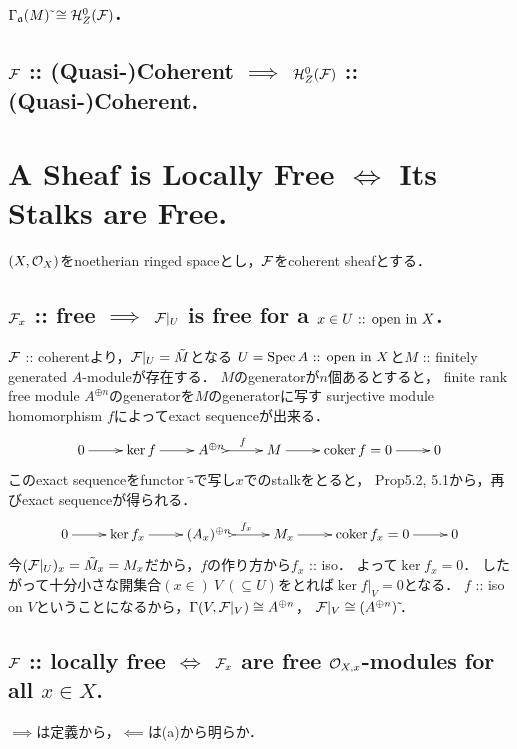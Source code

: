 \documentclass[a4paper]{jsarticle}
\begin{document}
    \subsection{$\Gamma_{\mathfrak{a}}(M)\,\tilde{} \cong \mathcal{H}_Z^0(\mathcal{F})$.}

    \subsection{$\mathcal{F}$ :: (Quasi-)Coherent $\implies$ $\mathcal{H}_Z^0(\mathcal{F})$ :: (Quasi-)Coherent.}

\section{A Sheaf is Locally Free $\iff$ Its Stalks are Free.} %
    $(X,\mathcal{O}_X)$をnoetherian ringed spaceとし，$\mathcal{F}$をcoherent sheafとする．

    \subsection{$\mathcal{F}_x$ :: free $\implies$ $\mathcal{F}|_U$ is free for a $x \in U \text{ :: open in } X$.}
    $\mathcal{F}$ :: coherentより，$\mathcal{F}|_U=\tilde{M}$となる
    $U=\operatorname{Spec} A \text{ :: open in } X$と$M$ :: finitely generated $A$-moduleが存在する．
    $M$のgeneratorが$n$個あるとすると，
    finite rank free module $A^{\oplus n}$のgeneratorを$M$のgeneratorに写す
    surjective module homomorphism $f$によってexact sequenceが出来る．
    \[
        \xymatrix
        {
            0 \ar[r]& \ker f \ar[r]& A^{\oplus n} \ar@{>->}[r]^{f}& M \ar[r]& \coker f=0 \ar[r]& 0
        }
    \]
    このexact sequenceをfunctor $\tilde{\square}$で写し$x$でのstalkをとると，
    Prop5.2, 5.1から，再びexact sequenceが得られる．
    \[
        \xymatrix
        {
            0 \ar[r]& \ker f_x \ar[r]& (A_x)^{\oplus n} \ar@{>->}[r]^{f_x}& M_x \ar[r]& \coker f_x=0 \ar[r]& 0
        }
    \]
    今$(\mathcal{F}|_U)_x=\tilde{M}_x=M_x$だから，$f$の作り方から$f_x$ :: iso．
    よって$\ker f_x=0$．
    したがって十分小さな開集合$(x \in)~ V ~(\subseteq U)$をとれば$\ker f|_V=0$となる．
    $f$ :: iso on $V$ということになるから，$\Gamma(V,\mathcal{F}|_V) \cong A^{\oplus n}$，
    $\mathcal{F}|_V \cong (A^{\oplus n})\,\tilde{}$．

    \subsection{$\mathcal{F}$ :: locally free $\iff$ $\mathcal{F}_x$ are free $\mathcal{O}_{X,x}$-modules for all $x \in X$.}
    $\implies$は定義から，$\impliedby$は(a)から明らか．
\end{document}
